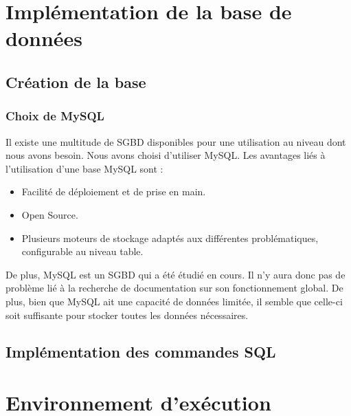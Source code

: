 \documentclass{article}
\begin{document}
\section{Implémentation de la base de données}
\subsection{Création de la base}
\subsubsection*{Choix de MySQL}
Il existe une multitude de SGBD disponibles pour une utilisation au niveau dont nous avons besoin. Nous avons choisi d'utiliser MySQL. Les avantages liés à l'utilisation d'une base MySQL sont :
\begin{itemize}
\item Facilité de déploiement et de prise en main.
\item Open Source.
\item Plusieurs moteurs de stockage adaptés aux différentes problématiques, configurable au niveau table. \\
\end{itemize}

De plus, MySQL est un SGBD qui a été étudié en cours. Il n'y aura donc pas de problème lié à la recherche de documentation sur son fonctionnement global. De plus, bien que MySQL ait une capacité de données limitée, il semble que celle-ci soit suffisante pour stocker toutes les données nécessaires.

\subsection{Implémentation des commandes SQL}

\section{Environnement d'exécution}
\end{document}
